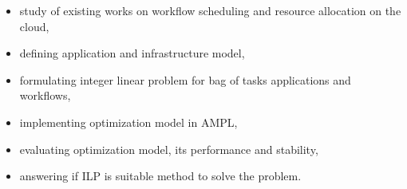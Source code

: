 \begin{itemize}
  \item study of existing works on workflow scheduling and resource allocation on the cloud,
  \item defining application and infrastructure model,
  \item formulating integer linear problem for bag of tasks applications and workflows,
  \item implementing optimization model in AMPL,
  \item evaluating optimization model, its performance and stability,
  \item answering if ILP is suitable method to solve the problem.
\end{itemize}
